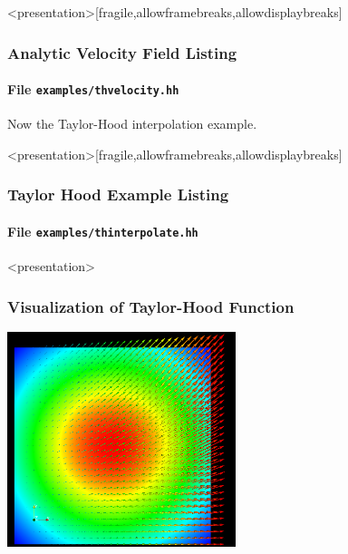 \begin{frame}<presentation>[fragile,allowframebreaks,allowdisplaybreaks]
\frametitle<presentation>{Analytic Velocity Field Listing}
\framesubtitle<presentation>{File \texttt{examples/thvelocity.hh}}

\end{frame}

Now the Taylor-Hood interpolation example.

\begin{frame}<presentation>[fragile,allowframebreaks,allowdisplaybreaks]
\frametitle<presentation>{Taylor Hood Example Listing}
\framesubtitle<presentation>{File \texttt{examples/thinterpolate.hh}}

\end{frame}

\begin{frame}<presentation>
\frametitle<presentation>{Visualization of Taylor-Hood Function}
\begin{center}
\includegraphics[width=0.5\textwidth]{./EPS/thinterpolate}
\end{center}
\end{frame}


